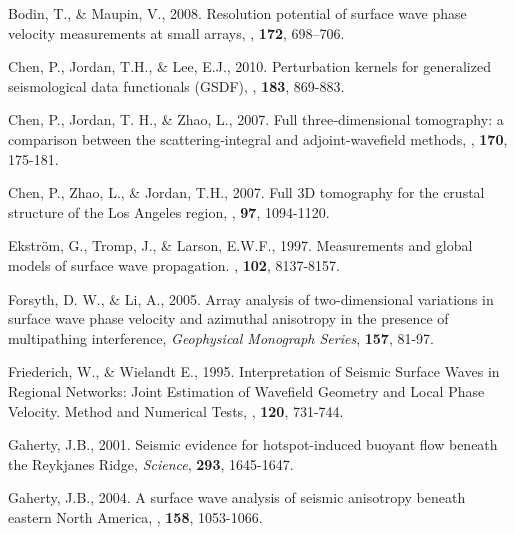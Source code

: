 \documentclass[referee]{gji}
\begin{document}
\begin{thebibliography}{}

	   Bodin, T., \& Maupin, V., 2008. Resolution potential of surface wave phase velocity measurements at small arrays, \textit{\gji}, \textbf{172}, 698–706.

	   Chen, P., Jordan, T.H., \& Lee, E.J., 2010. Perturbation kernels for generalized seismological data functionals (GSDF), \textit{\gji}, \textbf{183}, 869-883.

	   Chen, P., Jordan, T. H., \& Zhao, L., 2007. Full three‐dimensional tomography: a comparison between the scattering‐integral and adjoint‐wavefield methods, \textit{\gji}, \textbf{170}, 175-181.

	   Chen, P., Zhao, L., \& Jordan, T.H., 2007. Full 3D tomography for the crustal structure of the Los Angeles region, \textit{\bssa}, \textbf{97}, 1094-1120.

	   Ekstr\"{o}m, G., Tromp, J., \& Larson, E.W.F., 1997. Measurements and global models of surface wave propagation. \textit{\jgr}, \textbf{102}, 8137-8157. 

	   Forsyth, D. W., \& Li, A., 2005. Array analysis of two-dimensional variations in surface wave phase velocity and azimuthal anisotropy in the presence of multipathing interference, \textit{Geophysical Monograph Series}, \textbf{157}, 81-97.

   Friederich, W., \& Wielandt E., 1995. Interpretation of Seismic Surface Waves in Regional Networks: Joint Estimation of Wavefield Geometry and Local Phase Velocity. Method and Numerical Tests, \textit{\gjras}, \textbf{120}, 731-744.

	   Gaherty, J.B., 2001. Seismic evidence for hotspot-induced buoyant flow beneath the Reykjanes Ridge, \textit{Science}, \textbf{293}, 1645-1647.

	   Gaherty, J.B., 2004. A surface wave analysis of seismic anisotropy beneath eastern North America, \textbf{\gji}, \textbf{158}, 1053-1066.


\end{thebibliography}
\end{document}
